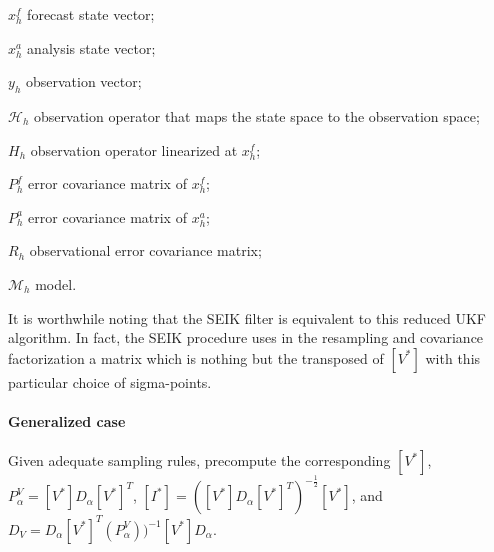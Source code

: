 \documentclass{tufte-book}
\newcounter{points}
\begin{document}
 $x_h^f$ forecast state vector; \par
 $x_h^a$ analysis state vector; \par
 $y_h$ observation vector; \par
 $\mathcal{H}_h$ observation operator that maps the state space to the observation space; \par
 $H_h$ observation operator linearized at $x^f_h$; \par
 $P^f_h$ error covariance matrix of $x_h^f$; \par
 $P^a_h$ error covariance matrix of $x_h^a$; \par
 $R_h$ observational error covariance matrix; \par
 $\mathcal{M}_h$ model.

\-It is worthwhile noting that the \-S\-E\-I\-K filter is equivalent to this reduced \-U\-K\-F algorithm. \-In fact, the \-S\-E\-I\-K procedure uses in the resampling and covariance factorization a matrix which is nothing but the transposed of $[V^*]$ with this particular choice of sigma-\/points.

\hypertarget{reduced_order_unscented_kalman_filter_algorithm7}{}\paragraph{\-Generalized case}\label{reduced_order_unscented_kalman_filter_algorithm7}

\-Given adequate sampling rules, precompute the corresponding $[V^*]$, $P_{\alpha}^V = [V^*] D_\alpha [V^*]^T $, $[I^*] = ([V^*] D_\alpha [V^*]^T)^{-\frac{1}{2}} [V^*]$, and $D_V = D_\alpha [V^*]^T (P_{\alpha}^V))^{-1} [V^*] D_\alpha $.
\end{document}
